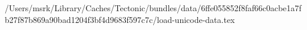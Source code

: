 /Users/msrk/Library/Caches/Tectonic/bundles/data/6ffe055852f8faf66c0acbe1a7fb27f87b869a90bad1204f3bf4d9683f597c7c/load-unicode-data.tex
